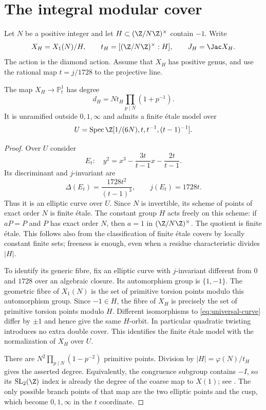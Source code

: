 \section{The integral modular cover}

Let $N$ be a positive integer and let
$H\subset(\Z/N\Z)^\times$ contain $-1$. Write
\[
 X_H=X_1(N)/H,\qquad t_H=[(\Z/N\Z)^\times:H],
 \qquad J_H=\Jac X_H.
\]
The action is the diamond action. Assume that $X_H$ has positive
genus, and use the rational map $t=j/1728$ to the projective line.

\begin{lemma}\label{lem:modular-model}
The map $X_H\to\mathbb P^1_t$ has degree
\[
 d_H=Nt_H\prod_{p\mid N}(1+p^{-1}).
\]
It is unramified outside $0,1,\infty$ and admits a finite \'etale
model over
\[
 U=\operatorname{Spec}\Z[1/(6N),t,t^{-1},(t-1)^{-1}].
\]
\end{lemma}
\begin{proof}
Over $U$ consider
\begin{equation}\label{eq:universal-curve}
 E_t:\quad y^2=x^3-\frac{3t}{t-1}x-\frac{2t}{t-1}.
\end{equation}
Its discriminant and $j$-invariant are
\[
 \Delta(E_t)=\frac{1728t^2}{(t-1)^3},\qquad j(E_t)=1728t.
\]
Thus it is an elliptic curve over $U$. Since $N$ is invertible,
its scheme of points of exact order $N$ is finite \'etale.
The constant group $H$ acts freely on this scheme: if $aP=P$
and $P$ has exact order $N$, then $a=1$ in $(\Z/N\Z)^\times$.
The quotient is finite \'etale. This follows also from the
classification of finite \'etale covers by locally constant finite
sets; freeness is enough, even when a residue characteristic divides
$|H|$.

To identify its generic fibre, fix an elliptic curve with
$j$-invariant different from $0$ and $1728$ over an algebraic
closure. Its automorphism group is $\{1,-1\}$. The geometric
fibre of $X_1(N)$ is the set of primitive torsion points modulo
this automorphism group. Since $-1\in H$, the fibre of $X_H$
is precisely the set of primitive torsion points modulo $H$.
Different isomorphisms to \eqref{eq:universal-curve} differ by
$\pm1$ and hence give the same $H$-orbit. In particular quadratic
twisting introduces no extra double cover. This identifies the
finite \'etale model with the normalization of $X_H$ over $U$.

There are $N^2\prod_{p\mid N}(1-p^{-2})$ primitive points.
Division by $|H|=\varphi(N)/t_H$ gives the asserted degree.
Equivalently, the congruence subgroup contains $-I$, so its
$\operatorname{SL}_2(\Z)$ index is already the degree of the
coarse map to $X(1)$; see \cite[Section~4]{vonKaenel}.
The only possible branch points of that map are the two elliptic
points and the cusp, which become $0,1,\infty$ in the $t$ coordinate.
\end{proof}

